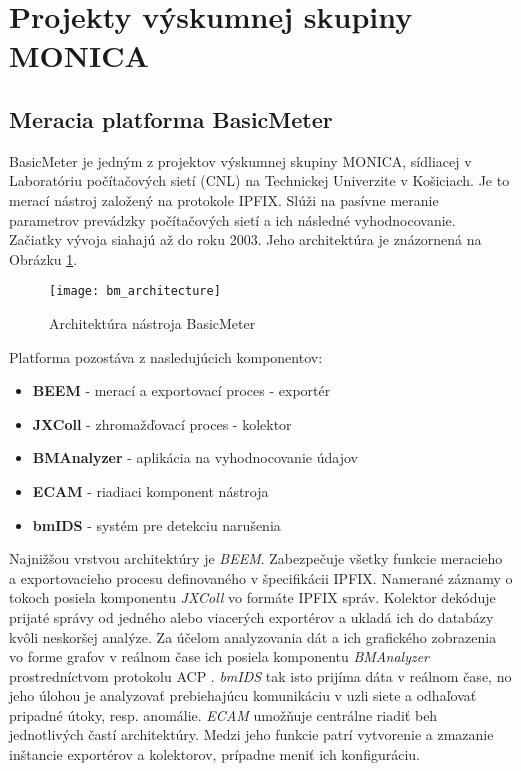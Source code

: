\section{Projekty v\'yskumnej skupiny MONICA}

\subsection{Meracia platforma BasicMeter}

BasicMeter \citep{monica} je jedným z projektov výskumnej 
skupiny MONICA, sídliacej v Laboratóriu počítačových sietí (CNL) na Technickej Univerzite v Košiciach. 
Je to merací nástroj založený na protokole IPFIX. Slúži na pasívne meranie parametrov prevádzky 
počítačových sietí a ich následné vyhodnocovanie. Začiatky vývoja siahajú až do roku 2003. Jeho 
architektúra je znázornená na Obrázku \ref{o:bm_architecture}.

\begin{figure}[ht!]
\centering
\texttt{[image: bm\_architecture]}
\caption{Architektúra nástroja BasicMeter \citep{ja}}\label{o:bm_architecture}
\end{figure}

Platforma pozostáva z nasledujúcich komponentov:
\begin{itemize}
 \item \textbf{BEEM} - merací a exportovací proces - exportér
 \item \textbf{JXColl} - zhromažďovací proces - kolektor
 \item \textbf{BMAnalyzer} - aplikácia na vyhodnocovanie údajov
 \item \textbf{ECAM} - riadiaci komponent nástroja
 \item \textbf{bmIDS} - systém pre detekciu narušenia
\end{itemize}

Najnižšou vrstvou architektúry je \emph{BEEM}. Zabezpečuje všetky funkcie 
meracieho a exportovacieho procesu definovaného v špecifikácii IPFIX. Namerané záznamy o tokoch
posiela komponentu \emph{JXColl} vo formáte IPFIX správ. Kolektor dekóduje prijaté správy od jedného
alebo viacerých exportérov a ukladá ich do databázy kvôli neskoršej analýze. Za účelom analyzovania dát
a ich grafického zobrazenia vo forme grafov v reálnom čase ich posiela komponentu \emph{BMAnalyzer} 
prostredníctvom 
protokolu ACP \citep{ado}. \emph{bmIDS} tak isto prijíma dáta v reálnom čase, no jeho úlohou je analyzovať
prebiehajúcu komunikáciu v uzli siete a odhaľovať pripadné útoky, resp. anomálie. \emph{ECAM} umožňuje 
centrálne riadiť beh jednotlivých častí architektúry. Medzi jeho funkcie patrí vytvorenie a zmazanie 
inštancie exportérov a kolektorov, prípadne meniť ich konfiguráciu. \citep{ja, veri}

